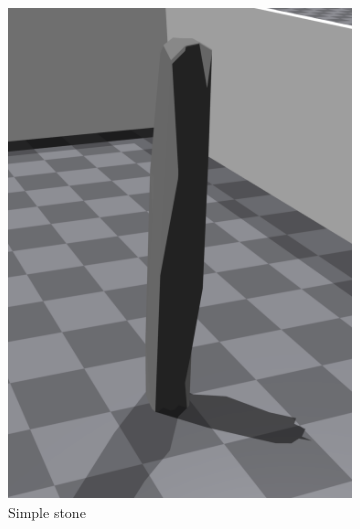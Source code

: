 \begin{figure}[H]
\begin{subfigure}[b]{0.3\textwidth}
         \includegraphics[width=\textwidth]{figures/6_/simple_stone.png}
         \caption{Simple stone}
         \label{fig:6_obst_simple_stone}
     \end{subfigure} 
     \hspace{0.15\textwidth}
     \begin{subfigure}[b]{0.3\textwidth}
         \centering
         \captionsetup{justification=centering}

\end{subfigure}
\end{figure}
